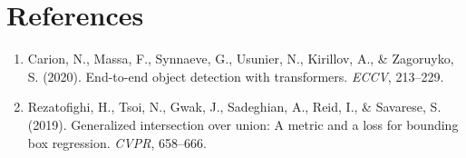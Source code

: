 \documentclass[11pt,a4paper]{article}
\theoremstyle{definition}
\begin{document}
\section{References}
\begin{enumerate}
    \item Carion, N., Massa, F., Synnaeve, G., Usunier, N., Kirillov, A., & Zagoruyko, S. (2020). End-to-end object detection with transformers. \emph{ECCV}, 213--229.
    \item Rezatofighi, H., Tsoi, N., Gwak, J., Sadeghian, A., Reid, I., & Savarese, S. (2019). Generalized intersection over union: A metric and a loss for bounding box regression. \emph{CVPR}, 658--666.
\end{enumerate}
\end{document}

